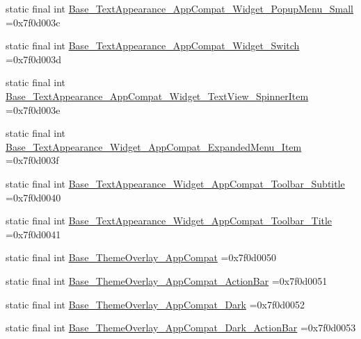 \begin{DoxyCompactItemize}
\item 
static final int \mbox{\hyperlink{classbr_1_1unb_1_1cic_1_1mp_1_1marketmaster_1_1R_1_1style_a591ba1b0f78b13d868ff41945baa6738}{Base\+\_\+\+Text\+Appearance\+\_\+\+App\+Compat\+\_\+\+Widget\+\_\+\+Popup\+Menu\+\_\+\+Small}} =0x7f0d003c
\item 
static final int \mbox{\hyperlink{classbr_1_1unb_1_1cic_1_1mp_1_1marketmaster_1_1R_1_1style_aedae17ba35a806e06217d3717f0b1234}{Base\+\_\+\+Text\+Appearance\+\_\+\+App\+Compat\+\_\+\+Widget\+\_\+\+Switch}} =0x7f0d003d
\item 
static final int \mbox{\hyperlink{classbr_1_1unb_1_1cic_1_1mp_1_1marketmaster_1_1R_1_1style_ab37aa3636baf17ab663c11af90a1c2ec}{Base\+\_\+\+Text\+Appearance\+\_\+\+App\+Compat\+\_\+\+Widget\+\_\+\+Text\+View\+\_\+\+Spinner\+Item}} =0x7f0d003e
\item 
static final int \mbox{\hyperlink{classbr_1_1unb_1_1cic_1_1mp_1_1marketmaster_1_1R_1_1style_a09dc1337e759c9a1538fa809afa8db9d}{Base\+\_\+\+Text\+Appearance\+\_\+\+Widget\+\_\+\+App\+Compat\+\_\+\+Expanded\+Menu\+\_\+\+Item}} =0x7f0d003f
\item 
static final int \mbox{\hyperlink{classbr_1_1unb_1_1cic_1_1mp_1_1marketmaster_1_1R_1_1style_a06b0928d7f61a73e17c726bbb26757fa}{Base\+\_\+\+Text\+Appearance\+\_\+\+Widget\+\_\+\+App\+Compat\+\_\+\+Toolbar\+\_\+\+Subtitle}} =0x7f0d0040
\item 
static final int \mbox{\hyperlink{classbr_1_1unb_1_1cic_1_1mp_1_1marketmaster_1_1R_1_1style_aebbfe1dede11e679d8dd3158fb6f85bb}{Base\+\_\+\+Text\+Appearance\+\_\+\+Widget\+\_\+\+App\+Compat\+\_\+\+Toolbar\+\_\+\+Title}} =0x7f0d0041
\item 
static final int \mbox{\hyperlink{classbr_1_1unb_1_1cic_1_1mp_1_1marketmaster_1_1R_1_1style_a9e759934ae7cfeb27c6fc29526e88607}{Base\+\_\+\+Theme\+Overlay\+\_\+\+App\+Compat}} =0x7f0d0050
\item 
static final int \mbox{\hyperlink{classbr_1_1unb_1_1cic_1_1mp_1_1marketmaster_1_1R_1_1style_a5784e222b6cf3e11a531a38c5b447e85}{Base\+\_\+\+Theme\+Overlay\+\_\+\+App\+Compat\+\_\+\+Action\+Bar}} =0x7f0d0051
\item 
static final int \mbox{\hyperlink{classbr_1_1unb_1_1cic_1_1mp_1_1marketmaster_1_1R_1_1style_a632ebcb28a867081d0428472efb11f3e}{Base\+\_\+\+Theme\+Overlay\+\_\+\+App\+Compat\+\_\+\+Dark}} =0x7f0d0052
\item 
static final int \mbox{\hyperlink{classbr_1_1unb_1_1cic_1_1mp_1_1marketmaster_1_1R_1_1style_ae1abe37c1e3b460b30c9bf292b20073d}{Base\+\_\+\+Theme\+Overlay\+\_\+\+App\+Compat\+\_\+\+Dark\+\_\+\+Action\+Bar}} =0x7f0d0053

\end{DoxyCompactItemize}
